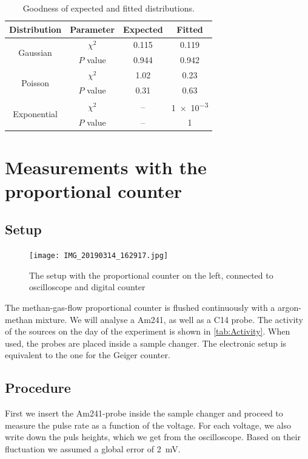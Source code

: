 \begin{table}[H]
	\renewcommand{\arraystretch}{1.5}
	\centering
	\begin{tabular}{|c|c|c|c|}
		\hline
		Distribution & Parameter & Expected & Fitted \\
		\hline
		\multirow{2}{*}{Gaussian} & $\chi^2$ & \SI{0.115}{} & \SI{0.119}{} \\
		 & $P$ value & \SI{0.944}{} & \SI{0.942}{} \\
		\hline
		\multirow{2}{*}{Poisson} & $\chi^2$ & \SI{1.02}{} & \SI{0.23}{} \\
		 & $P$ value & \SI{0.31}{} & \SI{0.63}{} \\
		\hline
		\multirow{2}{*}{Exponential} & $\chi^2$ & -- & \SI{1e-3}{} \\
		 & $P$ value & -- & \SI{1}{} \\
		\hline
	\end{tabular}
	\caption{Goodness of expected and fitted distributions.}
	\label{tab:DistGood}
\end{table}

\section{Measurements with the proportional counter}

\subsection{Setup}

\begin{figure}[H]
	\centering
	\texttt{[image: IMG\_20190314\_162917.jpg]}
	\caption{The setup with the proportional counter on the left, connected to oscilloscope and digital counter}
	\label{fig:}
\end{figure}

The methan-gas-flow proportional counter is flushed continuously with a argon-methan mixture. We will analyse a Am241, as well as a C14 probe. The activity of the sources on the day of the experiment is shown in \cref{tab:Activity}. When used, the probes are placed inside a sample changer. The electronic setup is equivalent to the one for the Geiger counter.

\subsection{Procedure}

First we insert the Am241-probe inside the sample changer and proceed to measure the pulse rate as a function of the voltage. For each voltage, we also write down the puls heights, which we get from the oscilloscope. Based on their fluctuation we assumed a global error of \SI{2}{mV}.

